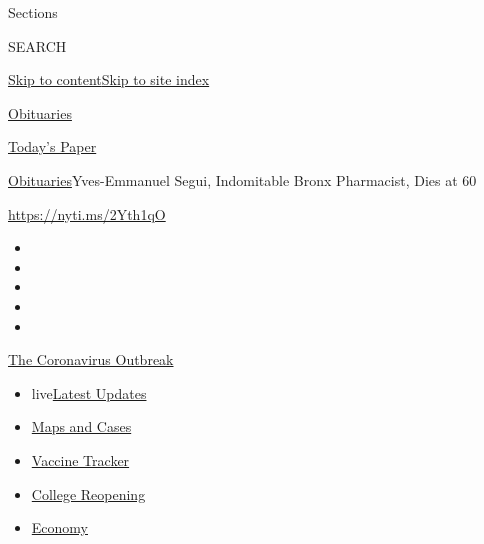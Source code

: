Sections

SEARCH

\protect\hyperlink{site-content}{Skip to
content}\protect\hyperlink{site-index}{Skip to site index}

\href{https://www.nytimes.com/section/obituaries}{Obituaries}

\href{https://myaccount.nytimes.com/auth/login?response_type=cookie\&client_id=vi}{}

\href{https://www.nytimes.com/section/todayspaper}{Today's Paper}

\href{/section/obituaries}{Obituaries}\textbar{}Yves-Emmanuel Segui,
Indomitable Bronx Pharmacist, Dies at 60

\url{https://nyti.ms/2Yth1qO}

\begin{itemize}
\item
\item
\item
\item
\item
\end{itemize}

\href{https://www.nytimes.com/news-event/coronavirus?action=click\&pgtype=Article\&state=default\&region=TOP_BANNER\&context=storylines_menu}{The
Coronavirus Outbreak}

\begin{itemize}
\tightlist
\item
  live\href{https://www.nytimes.com/2020/08/03/world/coronavirus-covid-19.html?action=click\&pgtype=Article\&state=default\&region=TOP_BANNER\&context=storylines_menu}{Latest
  Updates}
\item
  \href{https://www.nytimes.com/interactive/2020/us/coronavirus-us-cases.html?action=click\&pgtype=Article\&state=default\&region=TOP_BANNER\&context=storylines_menu}{Maps
  and Cases}
\item
  \href{https://www.nytimes.com/interactive/2020/science/coronavirus-vaccine-tracker.html?action=click\&pgtype=Article\&state=default\&region=TOP_BANNER\&context=storylines_menu}{Vaccine
  Tracker}
\item
  \href{https://www.nytimes.com/2020/08/02/us/covid-college-reopening.html?action=click\&pgtype=Article\&state=default\&region=TOP_BANNER\&context=storylines_menu}{College
  Reopening}
\item
  \href{https://www.nytimes.com/live/2020/08/03/business/stock-market-today-coronavirus?action=click\&pgtype=Article\&state=default\&region=TOP_BANNER\&context=storylines_menu}{Economy}
\end{itemize}

